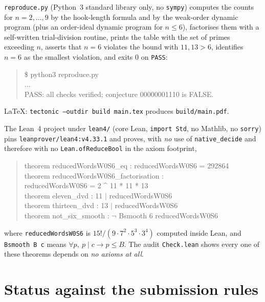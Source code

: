 \documentclass[11pt]{article}
\theoremstyle{definition}
\theoremstyle{remark}
\begin{document}
\texttt{reproduce.py} (Python~3 standard library only, no \texttt{sympy})
computes the counts for $n = 2,\dots,9$ by the hook-length formula and by the
weak-order dynamic program (plus an order-ideal dynamic program for
$n\le 6$), factorises them with a self-written trial-division routine, prints
the table with the set of primes exceeding $n$, asserts that $n = 6$ violates
the bound with $11, 13 > 6$, identifies $n = 6$ as the smallest violation,
and exits $0$ on \texttt{PASS}:

\begin{quote}\ttfamily
\$ python3 reproduce.py\\
...\\
PASS: all checks verified; conjecture 00000001110 is FALSE.
\end{quote}

LaTeX: \texttt{tectonic --outdir build main.tex} produces
\texttt{build/main.pdf}.

The Lean~4 project under \texttt{lean4/} (core Lean, \texttt{import Std}, no
Mathlib, no \texttt{sorry}) pins \texttt{leanprover/lean4:v4.33.1} and proves,
with \emph{no} use of \texttt{native\_decide} and therefore with no
\texttt{Lean.ofReduceBool} in the axiom footprint,
\begin{quote}\ttfamily\small\raggedright
theorem reducedWordsW0S6\_eq : reducedWordsW0S6 = 292864\\
theorem reducedWordsW0S6\_factorisation :\\
\hspace*{2em}reducedWordsW0S6 = 2 \^{} 11 * 11 * 13\\
theorem eleven\_dvd : 11 \(|\) reducedWordsW0S6\\
theorem thirteen\_dvd : 13 \(|\) reducedWordsW0S6\\
theorem not\_six\_smooth : \(\neg\) Bsmooth 6 reducedWordsW0S6
\end{quote}
where \texttt{reducedWordsW0S6} is $15!/(9\cdot7^2\cdot5^3\cdot3^4)$ computed
inside Lean, and \texttt{Bsmooth B c} means $\forall p,\ p \mid c \to p \le
B$. The audit \texttt{Check.lean} shows every one of these theorems depends on
\emph{no axioms at all}.

\section*{Status against the submission rules}
\end{document}
